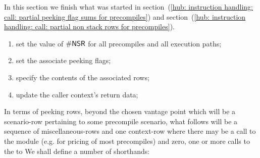 In this section we finish what was started in
section~(\ref{hub: instruction handling: call: partial peeking flag sums for precompiles}) and
section~(\ref{hub: instruction handling: call: partial non stack rows for precompiles}).
\begin{enumerate}
	\item set the value of $\textsf{\#NSR}$ for all precompiles and all execution paths;
	\item set the associate peeking flags;
	\item specify the contents of the associated rows;
	\item update the caller context's return data;
\end{enumerate}
In terms of peeking rows, beyond the chosen vantage point which will be a scenario-row pertaining to some precompile scenario, what follows will be a sequence of miscellaneous-rows and one context-row where there may be a call to the \oobMod{} module (e.g. for pricing of most precompiles) and zero, one or more calls to the \mmuMod{} to
We shall define a number of shorthands:
